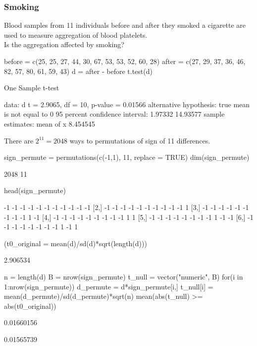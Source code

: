 \documentclass[a4paper]{article}\usepackage[]{graphicx}\usepackage[]{xcolor}
\begin{document}
\subsubsection{Smoking}
Blood samples from 11 individuals before and after they smoked a cigarette are used to measure aggregation of blood platelets.\\
Is the aggregation affected by smoking?
\begin{Schunk}
\begin{Sinput}
before = c(25, 25, 27, 44, 30, 67, 53, 53, 52, 60, 28)
after =  c(27, 29, 37, 36, 46, 82, 57, 80, 61, 59, 43)  
d = after - before
t.test(d)
\end{Sinput}
\begin{Soutput}

	One Sample t-test

data:  d
t = 2.9065, df = 10, p-value = 0.01566
alternative hypothesis: true mean is not equal to 0
95 percent confidence interval:
  1.97332 14.93577
sample estimates:
mean of x 
 8.454545 
\end{Soutput}
\end{Schunk}
There are \( 2^{11} = 2048 \) ways to permutations of sign of 11 differences.
\begin{Schunk}
\begin{Sinput}
sign_permute = permutations(c(-1,1), 11, replace = TRUE)
dim(sign_permute)
\end{Sinput}
\begin{Soutput}
[1] 2048   11
\end{Soutput}
\begin{Sinput}
head(sign_permute)
\end{Sinput}
\begin{Soutput}
     [,1] [,2] [,3] [,4] [,5] [,6] [,7] [,8] [,9] [,10] [,11]
[1,]   -1   -1   -1   -1   -1   -1   -1   -1   -1    -1    -1
[2,]   -1   -1   -1   -1   -1   -1   -1   -1   -1    -1     1
[3,]   -1   -1   -1   -1   -1   -1   -1   -1   -1     1    -1
[4,]   -1   -1   -1   -1   -1   -1   -1   -1   -1     1     1
[5,]   -1   -1   -1   -1   -1   -1   -1   -1    1    -1    -1
[6,]   -1   -1   -1   -1   -1   -1   -1   -1    1    -1     1
\end{Soutput}
\begin{Sinput}
(t0_original = mean(d)/sd(d)*sqrt(length(d)))
\end{Sinput}
\begin{Soutput}
[1] 2.906534
\end{Soutput}
\begin{Sinput}
n = length(d)
B = nrow(sign_permute)
t_null = vector("numeric", B)
for(i in 1:nrow(sign_permute)){
  d_permute = d*sign_permute[i,]
  t_null[i] = mean(d_permute)/sd(d_permute)*sqrt(n)
}
mean(abs(t_null) >= abs(t0_original))
\end{Sinput}
\begin{Soutput}
[1] 0.01660156
\end{Soutput}
\begin{Soutput}
[1] 0.01565739
\end{Soutput}
\end{Schunk}
\end{document}
